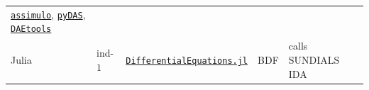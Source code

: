 \documentclass[]{book}
\theoremstyle{definition}
\theoremstyle{definition}
\theoremstyle{definition}
\theoremstyle{remark}
\begin{document}
\begin{longtable}[]{@{}lllll@{}}
\begin{minipage}[t]{0.37\columnwidth}
\href{https://jmodelica.org/assimulo/index.html\#}{\texttt{assimulo}},
\href{https://github.com/jwallen/PyDAS}{\texttt{pyDAS}},
\href{http://daetools.com/docs/index.html}{\texttt{DAEtools}}\strut
\end{minipage}\tabularnewline
\begin{minipage}[t]{0.06\columnwidth}\raggedright\strut
Julia\strut
\end{minipage} & \begin{minipage}[t]{0.06\columnwidth}\raggedright\strut
ind-\(1\)\strut
\end{minipage} & \begin{minipage}[t]{0.27\columnwidth}\raggedright\strut
\href{https://docs.juliadiffeq.org/latest/index.html}{\texttt{DifferentialEquations.jl}}\strut
\end{minipage} & \begin{minipage}[t]{0.06\columnwidth}\raggedright\strut
BDF\strut
\end{minipage} & \begin{minipage}[t]{0.37\columnwidth}\raggedright\strut
calls SUNDIALS IDA\strut
\end{minipage}\tabularnewline
\bottomrule
\end{longtable}


\end{document}
